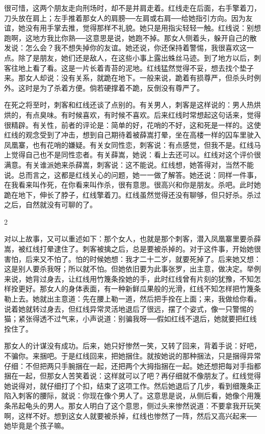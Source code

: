 很可惜，这两个朋友走向刑场时，却不是并肩走着。红线走在后面，右手擎着刀，刀头放在肩上；左手推着那女人的肩膀──左肩或右肩──给她指引方向。因为友谊，她没有用手掌去推，觉得那样不礼貌。她只是用指尖轻轻一触。红线说：别想跑啊，这地方我比你熟──这意思是说，她跑不掉。那女人侧着头，躲开自己的散发说：怎么会？我不想失掉你的友谊。她还说，你还保持着警惕，我很喜欢这一点。除了是朋友，她们还是敌人，在这些小事上露出蛛丝马迹。到了地方以后，刺客往地上看了看。这是一片长着青苔的泥地。红线猛然觉得不妥，想去找个垫子来。那女人却说：没有关系，就跪在地下。一般来说，跪着有损尊严，但杀头时例外。这时是为了杀着方便。倘若硬撑着不跪，反倒没有尊严了。 

在死之将至时，刺客和红线还谈了点别的。有关男人，刺客是这样说的：男人热烘烘的，有点臭味。有时候喜欢，有时候不喜欢。后来红线时常想起这句话来，觉得很精辟。有关性，前者的评论是：简单的好，花哨的不好，这和死是一样的。这使红线的观念受到了冲击，想到自己期待着被薛嵩打晕，坐在高楼一样的囚车里驶入凤凰寨，也有花哨的嫌疑。有关女同性恋，刺客说：有点感觉，但我不是。红线马上觉得自己也不是同性恋者。有关薛嵩，她说：看上去还可以。红线对这个评价很满意。有关谁派她来杀薛嵩，刺客说：这不能说。红线想，她答得对，当然不能说。总而言之，这都是红线关心的问题，她一一做了解答。她还说：同样一件事，在我看来叫作死，在你看来叫作杀，很有意思。很高兴和你是朋友。杀吧。此时她跪在地下，伸长了脖子，红线擎着刀。红线虽然觉得还没有聊够，但只好杀。杀过之后，自然就没有可聊的了。 

2 

对以上故事，又可以重述如下：那个女人，也就是那个刺客，潜入凤凰寨里要杀薛嵩，被红线打晕逮住了。刺客被擒之后，总是要被杀掉的。对于这件事，开始她很害怕，后来又不怕了。怕的时候她想：我才二十二岁，就要死掉了。后来她又想：这是别人要杀我呀；所以就不怕。但她依旧要为此事张罗，出主意，做决定。举例来说，她背过身去，让红线用竹篾条拴她的手，此时红线曾有片刻的犹豫，不知怎样拴更好。那女人的身体表面，有一种新鲜瓜果般的光滑，红线不知怎样把竹篾条勒上去。她就出主意道：先在腰上勒一道，然后把手拴在上面；来，我做给你看。说着她就转过身去，但红线异常灵活地退后了很远，摆了个姿式，像一只警惕的猫；紧张得透不过气来，小声说道：别骗我呀──假如红线不退后，她就要把红线拴住了。 

那女人的计谋没有成功。后来，她只好惨然一笑，又转了回来，背着手说：好吧，不骗你。来捆吧。于是红线回来，把她捆住。就按她说的那种捆法，只是捆得异常仔细：不但把两只手腕捆在一起，还把两个大拇指捆在一起。她还想把每对手指都捆在一起，但那女人苦笑着说：这样就可以了吧？再仔细就不像朋友了。红线觉得她说得对，就仔细打了个扣，结束了这项工作。然后她退后了几步，看到细篾条正陷入刺客的腰际，就说：你现在像个男人了。这意思是说，从侧后看，她像个用篾条吊起龟头的男人。那女人明白了这个意思，侧过头来惨然说道：不要拿我开玩笑啊，这样不好。想到这女人就要被杀掉，红线也惨然了一阵，然后又高兴起来──她毕竟是个孩子嘛。 


